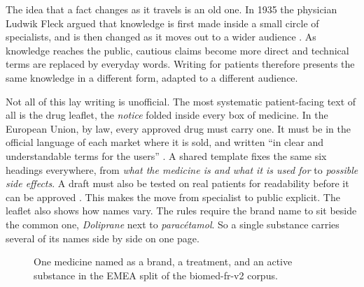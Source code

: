 \begin{reviewread}
The idea that a fact changes as it travels is an old one.
In 1935 the physician Ludwik Fleck argued that knowledge is first made inside a small circle of specialists, and is then changed as it moves out to a wider audience \citep{fleck_genesis_1979}.
As knowledge reaches the public, cautious claims become more direct and technical terms are replaced by everyday words.
Writing for patients therefore presents the same knowledge in a different form, adapted to a different audience.
\end{reviewread}

\begin{reviewread}
Not all of this lay writing is unofficial.
The most systematic patient-facing text of all is the drug leaflet, the \emph{notice} folded inside every box of medicine.
In the European Union, by law, every approved drug must carry one.
It must be in the official language of each market where it is sold, and written ``in clear and understandable terms for the users'' \citep{ec_directive_2001_83}.
A shared template fixes the same six headings everywhere, from \emph{what the medicine is and what it is used for} to \emph{possible side effects}.
A draft must also be tested on real patients for readability before it can be approved \citep{ema_qrd_template}.
This makes the move from specialist to public explicit.
The leaflet also shows how names vary.
The rules require the brand name to sit beside the common one, \emph{Doliprane} next to \emph{paracétamol}.
So a single substance carries several of its names side by side on one page.
\end{reviewread}

\begin{figure}[t]
\centering
{}
\caption{One medicine named as a brand, a treatment, and an active substance
in the EMEA split of the biomed-fr-v2 corpus.}
\label{fig:bt-emea-names}
\end{figure}

